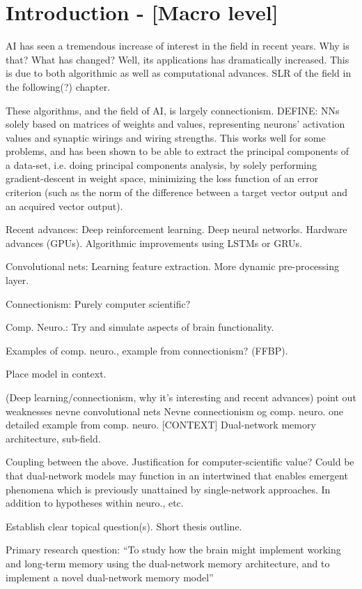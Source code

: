 
\chapter{Introduction - [Macro level]}\label{chpt:intro}


AI has seen a tremendous increase of interest in the field in recent years. Why is that? What has changed? Well, its applications has dramatically increased. This is due to both algorithmic as well as computational advances. SLR of the field in the following(?) chapter.

These algorithms, and the field of AI, is largely connectionism. DEFINE: NNs solely based on matrices of weights and values, representing neurons' activation values and synaptic wirings and wiring strengths. This works well for some problems, and has been shown to be able to extract the principal components of a data-set, i.e. doing principal components analysis, by solely performing gradient-descent in weight space, minimizing the loss function of an error criterion (such as the norm of the difference between a target vector output and an acquired vector output).

Recent advances: Deep reinforcement learning. Deep neural networks. Hardware advances (GPUs). Algorithmic improvements using LSTMs or GRUs.

Convolutional nets: Learning feature extraction. More dynamic pre-processing layer.

Connectionism: Purely computer scientific?

Comp. Neuro.: Try and simulate aspects of brain functionality.

Examples of comp. neuro., example from connectionism? (FFBP).

Place model in context.



(Deep learning/connectionism, why it’s interesting and recent advances)
point out weaknesses
nevne convolutional nets
Nevne connectionism og comp. neuro.
one detailed example from comp. neuro. [CONTEXT]
Dual-network memory architecture, sub-field.

Coupling between the above. Justification for computer-scientific value? 
Could be that dual-network models may function in an intertwined that enables emergent phenomena which is previously unattained by single-network approaches. In addition to hypotheses within neuro., etc.

Establish clear topical question(s).
Short thesis outline.

Primary research question: “To study how the brain might implement working and long-term memory using the dual-network memory architecture, and to implement a novel dual-network memory model”


\cleardoublepage